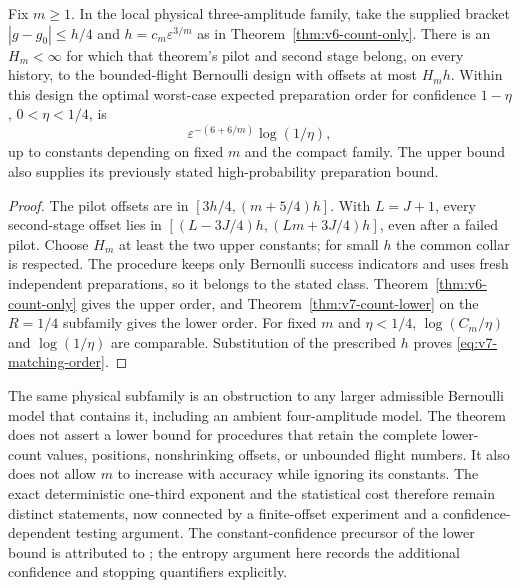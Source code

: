 \begin{corollary}
\label{cor:v7-design-optimal}
Fix $m\ge1$. In the local physical three-amplitude family, take the supplied bracket $|g-g_0|\le h/4$ and $h=c_m\varepsilon^{3/m}$ as in Theorem~\ref{thm:v6-count-only}. There is an $H_m<\infty$ for which that theorem's pilot and second stage belong, on every history, to the bounded-flight Bernoulli design with offsets at most $H_mh$. Within this design the optimal worst-case expected preparation order for confidence $1-\eta$, $0<\eta<1/4$, is
\begin{equation}\label{eq:v7-matching-order}
            \varepsilon^{-(6+6/m)}\log(1/\eta),
\end{equation}
up to constants depending on fixed $m$ and the compact family. The upper bound also supplies its previously stated high-probability preparation bound.
\end{corollary}
\begin{proof}
The pilot offsets are in $[3h/4,(m+5/4)h]$. With $L=J+1$, every second-stage offset lies in $[(L-3J/4)h,(Lm+3J/4)h]$, even after a failed pilot. Choose $H_m$ at least the two upper constants; for small $h$ the common collar is respected. The procedure keeps only Bernoulli success indicators and uses fresh independent preparations, so it belongs to the stated class. Theorem~\ref{thm:v6-count-only} gives the upper order, and Theorem~\ref{thm:v7-count-lower} on the $R=1/4$ subfamily gives the lower order. For fixed $m$ and $\eta<1/4$, $\log(C_m/\eta)$ and $\log(1/\eta)$ are comparable. Substitution of the prescribed $h$ proves \eqref{eq:v7-matching-order}.
\end{proof}

The same physical subfamily is an obstruction to any larger admissible Bernoulli model that contains it, including an ambient four-amplitude model. The theorem does not assert a lower bound for procedures that retain the complete lower-count values, positions, nonshrinking offsets, or unbounded flight numbers. It also does not allow $m$ to increase with accuracy while ignoring its constants. The exact deterministic one-third exponent and the statistical cost therefore remain distinct statements, now connected by a finite-offset experiment and a confidence-dependent testing argument. The constant-confidence precursor of the lower bound is attributed to \citet{RefereeV6}; the entropy argument here records the additional confidence and stopping quantifiers explicitly.
